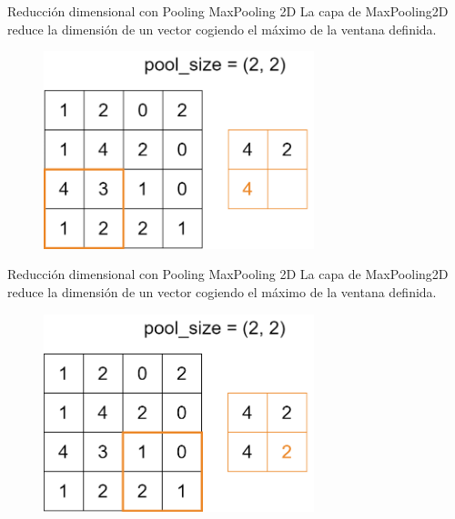 \begin{frame}{Reducción dimensional con Pooling}
\alert{\Large MaxPooling 2D}
La capa de MaxPooling2D reduce la dimensión de un vector cogiendo el \alert{máximo} de la ventana definida.

\begin{figure}
    \centering
    \includegraphics[width=0.7\textwidth]{Slides/figures/Tema 3/MaxPooling_4.png}
\end{figure}
\end{frame}

\begin{frame}{Reducción dimensional con Pooling}
\alert{\Large MaxPooling 2D}
La capa de MaxPooling2D reduce la dimensión de un vector cogiendo el \alert{máximo} de la ventana definida.

\begin{figure}
    \centering
    \includegraphics[width=0.7\textwidth]{Slides/figures/Tema 3/MaxPooling_5.png}
\end{figure}
\end{frame}

